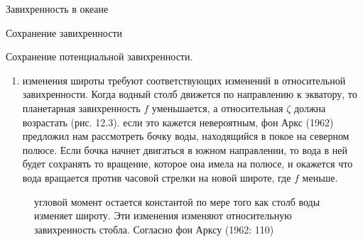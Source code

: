 \begin{chapter}{Завихренность в океане}
\begin{section}{Сохранение завихренности}
\begin{paragraph}{Сохранение потенциальной завихренности.}
\begin{enumerate}
\item
изменения широты требуют соответствующих изменений в относительной
завихренности. Когда водный столб движется по направлению к экватору,
то планетарная завихренность $f$ уменьшается, а относительная $\zeta$
должна возрастать (рис. 12.3). если это кажется невероятным, фон Аркс
(1962) предложил нам рассмотреть бочку воды, находящийся в покое на
северном полюсе. Если бочка начнет двигаться в южном направлении, то
вода в ней будет сохранять то вращение, которое она имела на полюсе, и
окажется что вода вращается против часовой стрелки на новой широте,
где $f$ меньше.
%
\end{enumerate}
\begin{figure}[b!]
\begin{center}
\end{center}
\caption{угловой момент остается константой по мере того как столб
воды изменяет широту. Эти изменения изменяют относительную
завихренность стобла. Согласно фон Арксу (1962: 110)}
\label{fig:planetaryvorticity}
\end{figure}
%
%
\end{paragraph}
\end{section}


\end{chapter}
